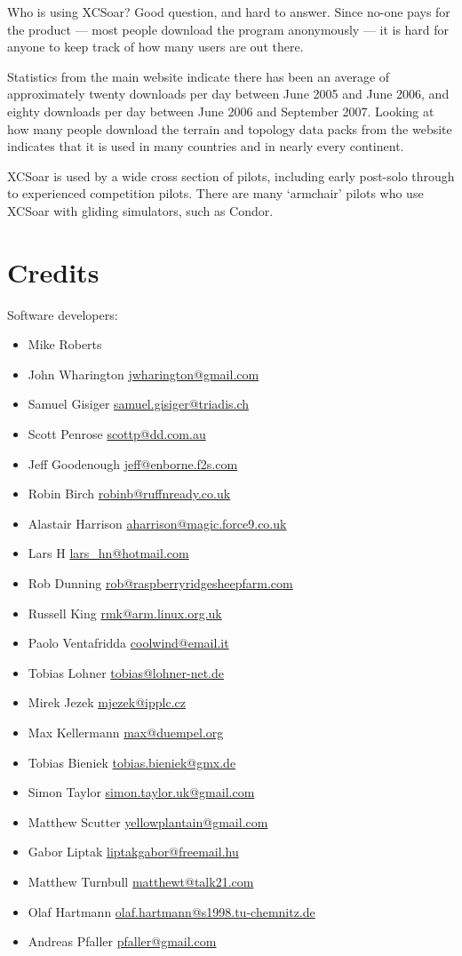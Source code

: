 Who is using XCSoar?  Good question, and hard to answer.  Since no-one
pays for the product --- most people download the program anonymously
--- it is hard for anyone to keep track of how many users are out
there.

Statistics from the main website indicate there has been an average of
approximately twenty downloads per day between June 2005 and June
2006, and eighty downloads per day between June 2006 and September
2007.  Looking at how many people download the terrain and topology
data packs from the website indicates that it is used in many
countries and in nearly every continent.

XCSoar is used by a wide cross section of pilots, including early
post-solo through to experienced competition pilots.  There are many
`armchair' pilots who use XCSoar with gliding simulators, such as
Condor.

\section{Credits}

Software developers:
\begin{itemize}
\item Mike Roberts 
\item John Wharington \url{jwharington@gmail.com}
\item Samuel Gisiger \url{samuel.gisiger@triadis.ch}
\item Scott Penrose \url{scottp@dd.com.au}
\item Jeff Goodenough \url{jeff@enborne.f2s.com}
\item Robin Birch \url{robinb@ruffnready.co.uk}
\item Alastair Harrison \url{aharrison@magic.force9.co.uk}
\item Lars H \url{lars_hn@hotmail.com}
\item Rob Dunning \url{rob@raspberryridgesheepfarm.com}
\item Russell King \url{rmk@arm.linux.org.uk}
\item Paolo Ventafridda \url{coolwind@email.it}
\item Tobias Lohner \url{tobias@lohner-net.de}
\item Mirek Jezek \url{mjezek@ipplc.cz}
\item Max Kellermann \url{max@duempel.org}
\item Tobias Bieniek \url{tobias.bieniek@gmx.de}
\item Simon Taylor \url{simon.taylor.uk@gmail.com}
\item Matthew Scutter \url{yellowplantain@gmail.com}
\item Gabor Liptak \url{liptakgabor@freemail.hu}
\item Matthew Turnbull \url{matthewt@talk21.com}
\item Olaf Hartmann \url{olaf.hartmann@s1998.tu-chemnitz.de}
\item Andreas Pfaller \url{pfaller@gmail.com}

\end{itemize}

